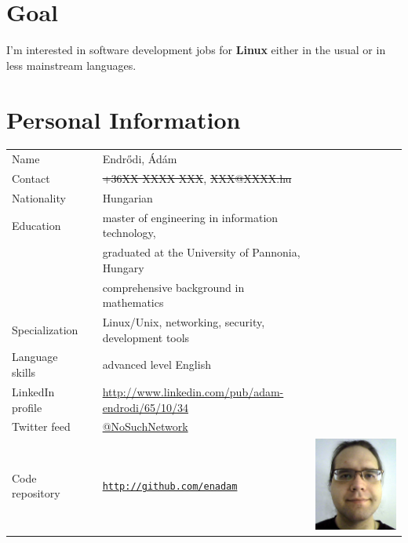 \documentclass[a4paper,12pt]{article}
\newcommand\Yell{\textbf}
\begin{document}
\section{Goal}

I'm interested in software development jobs for \Yell{Linux} either in
the usual or in less mainstream languages.

\section{Personal Information}

\begin{tabularx}{\linewidth}{lXll}
Name			&& Endr\H{o}di, \'Ad\'am			& \\
Contact			&& \sout{+36XX XXXX XXX}, \sout{XXX@XXXX.hu}	& \\
Nationality		&& Hungarian					& \\
Education		&& master of engineering in information technology, & \\
			&& graduated at the University of Pannonia, Hungary & \\
			&& comprehensive background in mathematics	& \\
Specialization		&& Linux/Unix, networking, security, development tools & \\
Language skills		&& advanced level English			& \\
LinkedIn profile	&& \url{http://www.linkedin.com/pub/adam-endrodi/65/10/34}
			 & \\
Twitter feed		&& \href{http://twitter.com/NoSuchNetwork}{@NoSuchNetwork}
			 &  \\
Code repository		&& \href{http://github.com/enadam?tab=repositories}%
			        {\nolinkurl{http://github.com/enadam}}
			 & \includegraphics*[scale=0.2,viewport=0 0 400 1,clip=false]{me} \\
\end{tabularx}
\end{document}
